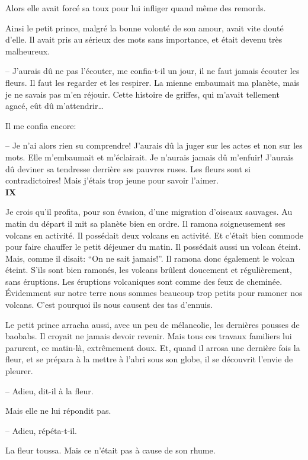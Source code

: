 \begin{Parallel}[p]{}{}
{Alors elle avait forcé sa toux pour lui infliger
quand même des remords.

\medskip

Ainsi le petit prince, malgré la bonne volonté de
son amour, avait vite douté d'elle. Il avait pris au
sérieux des mots sans importance, et était devenu
très malheureux.

-- J'aurais dû ne pas l'écouter, me confia-t-il un
jour, il ne faut jamais écouter les fleurs. Il faut les
regarder et les respirer. La mienne embaumait ma
planète, mais je ne savais pas m'en réjouir. Cette histoire de griffes, qui m'avait tellement agacé, eût dû
m'attendrir\ldots{}

Il me confia encore:

-- Je n'ai alors rien su comprendre! J'aurais dû
la juger sur les actes et non sur
les mots. Elle m'embaumait et
m'éclairait. Je n'aurais jamais dû
m'enfuir! J'aurais dû deviner sa
tendresse derrière ses pauvres ruses. Les fleurs sont si contradictoires! Mais j'étais trop jeune
pour savoir l'aimer.\\

\textbf{IX}

Je crois qu'il profita, pour son évasion, d'une
migration d'oiseaux sauvages. Au matin du départ il
mit sa planète bien en ordre. Il ramona soigneusement ses volcans en activité. Il possédait deux volcans en activité.
Et c'était bien commode pour faire
chauffer le petit déjeuner du matin. Il possédait
aussi un volcan éteint. Mais, comme il disait: ``On
ne sait jamais!''. Il ramona donc également le volcan
éteint. S'ils sont bien ramonés, les volcans brûlent
doucement et régulièrement, sans éruptions. Les
éruptions volcaniques sont comme des feux de cheminée. Évidemment sur notre terre nous sommes
beaucoup trop petits pour ramoner nos volcans.
C'est pourquoi ils nous causent des tas d'ennuis.

Le petit prince arracha aussi, avec un peu de
mélancolie, les dernières pousses de baobabs. Il
croyait ne jamais devoir revenir. Mais tous ces travaux familiers lui parurent, ce matin-là, extrêmement doux. Et, quand il arrosa une dernière fois la fleur, et se prépara à la mettre à l'abri sous son
globe, il se découvrit l'envie de pleurer.

-- Adieu, dit-il à la fleur.

Mais elle ne lui répondit pas.

-- Adieu, répéta-t-il.

La fleur toussa. Mais ce n'était pas à cause de son rhume.

}
\end{Parallel}
